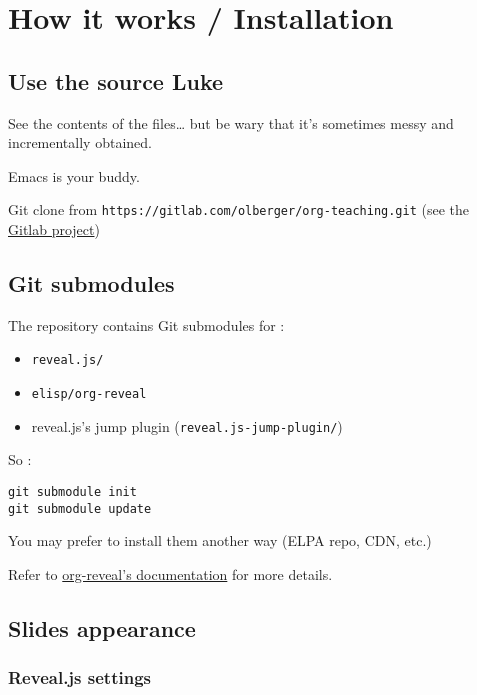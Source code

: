 \documentclass[a4paper]{article}
\newenvironment{NOTES}{\begin{lrbox}{\mybox}\begin{minipage}{0.9\textwidth}\begin{shaded}}{\end{shaded}\end{minipage}\end{lrbox}\fbox{\usebox{\mybox}}}
\begin{document}
\section{How it works / Installation}
\label{sec:org7adf186}
\subsection{Use the source Luke}
\label{sec:orgc3fdf4e}

See the contents of the files\ldots{} but be wary that it's sometimes messy and incrementally obtained.

Emacs is your buddy.

Git clone from \texttt{https://gitlab.com/olberger/org-teaching.git} (see the \href{https://gitlab.com/olberger/org-teaching}{Gitlab project})

\subsection{Git submodules}
\label{sec:org11e7929}

The repository contains Git submodules for :
\begin{itemize}
\item \texttt{reveal.js/}
\item \texttt{elisp/org-reveal}
\item reveal.js's jump plugin (\texttt{reveal.js-jump-plugin/})
\end{itemize}

So :
\begin{verbatim}
git submodule init
git submodule update
\end{verbatim}
You may prefer to install them another way (ELPA repo, CDN, etc.)

\begin{NOTES}
Refer to \href{https://github.com/yjwen/org-reveal/\#requirements-and-installation}{org-reveal's documentation} for more details.
\end{NOTES}

\subsection{Slides appearance}
\label{sec:orge88088a}

\subsubsection{Reveal.js settings}
\label{sec:org3a47131}
\end{document}
